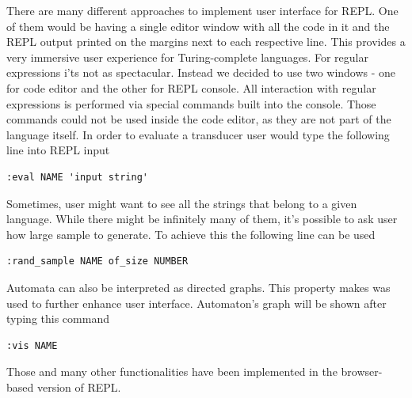 There are many different approaches to implement user interface for REPL.
One of them would be having a single editor window with all the code in it and the REPL output printed on the margins next to each respective line. This provides a very immersive user experience for Turing-complete languages. For regular expressions i'ts not as spectacular. Instead we decided to use two windows - one for code editor and the other for REPL console. All interaction with regular expressions is performed via special commands built into the console. Those commands could not be used inside the code editor, as they are not part of the language itself. In order to evaluate a transducer user would type the following line into REPL input
\begin{lstlisting}
:eval NAME 'input string'
\end{lstlisting}
Sometimes, user might want to see all the strings that belong to a given language. While there might be infinitely many of them, it's possible to ask user how large sample to generate. To achieve this the following line can be used
\begin{lstlisting}
:rand_sample NAME of_size NUMBER
\end{lstlisting}
Automata can also be interpreted as directed graphs. This property makes was used to further enhance user interface. Automaton's graph will be shown after typing this command
\begin{lstlisting}
:vis NAME
\end{lstlisting}
Those and many other functionalities have been implemented in the browser-based version of REPL. 


